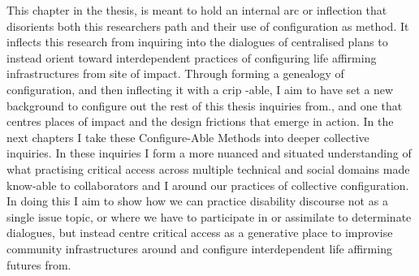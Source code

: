 This chapter in the thesis, is meant to hold an internal arc or
inflection that disorients both this researchers path and their use of
configuration as method. It inflects this research from inquiring into
the dialogues of centralised plans to instead orient toward
interdependent practices of configuring life affirming infrastructures
from site of impact. Through forming a genealogy of configuration, and
then inflecting it with a crip -able, I aim to have set a new background
to configure out the rest of this thesis inquiries from., and one that
centres places of impact and the design frictions that emerge in action.
In the next chapters I take these Configure-Able Methods into deeper
collective inquiries. In these inquiries I form a more nuanced and
situated understanding of what practising critical access across
multiple technical and social domains made know-able to collaborators
and I around our practices of collective configuration. In doing this I
aim to show how we can practice disability discourse not as a single
issue topic, or where we have to participate in or assimilate to
determinate dialogues, but instead centre critical access as a
generative place to improvise community infrastructures around and
configure interdependent life affirming futures from.
